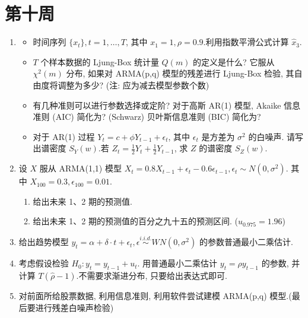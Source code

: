 \section{第十周}
\begin{enumerate}
    \item
    \begin{itemize}
    \item[1)] 时间序列 $\{x_{t}\}, t=1,\dots,T$, 其中 $x_{1}=1, \rho=0.9$.利用指数平滑公式计算 $\hat{x}_{3}$.
    
    \item[2)] $T$ 个样本数据的 Ljung-Box 统计量 $Q(m)$ 的定义是什么? 它服从 $\chi^{2}(m)$ 分布, 如果对 ARMA(p,q) 模型的残差进行 Ljung-Box 检验, 其自由度将调整为多少? (注: 应为减去模型参数个数)
    
    \item[3)] 有几种准则可以进行参数选择或定阶? 对于高斯 AR(1) 模型, Akaike 信息准则 (AIC) 简化为? (Schwarz) 贝叶斯信息准则 (BIC) 简化为?
    
    \item[4)] 对于 AR(1) 过程 $Y_{t}=c+\phi Y_{t-1}+\epsilon_{t}$, 其中 $\epsilon_t$ 是方差为 $\sigma^{2}$ 的白噪声.
    请写出谱密度 $S_{Y}(w)$.若 $Z_{t}=\frac{1}{2}Y_{t}+\frac{1}{2}Y_{t-1}$, 求 $Z$ 的谱密度 $S_{Z}(w)$.
   \end{itemize}

    \item 设 $X$ 服从 ARMA(1,1) 模型 $X_{t}=0.8X_{t-1}+\epsilon_{t}-0.6\epsilon_{t-1}, \epsilon_{t}\sim N(0,\sigma^{2})$.
    其中 $X_{100}=0.3, \epsilon_{100}=0.01$.
    \begin{enumerate}
        \item[(a)] 给出未来 1、2 期的预测值.
        \item[(b)] 给出未来 1、2 期的预测值的百分之九十五的预测区间. ($u_{0.975}=1.96$)
    \end{enumerate}

    \item 给出趋势模型 $y_{t}=\alpha+\delta \cdot t+\epsilon_{t}, \epsilon \overset{i.i.d.}{\sim} WN(0,\sigma^{2})$ 的参数普通最小二乘估计.

    \item 考虑假设检验 $H_{0}: y_{t}=y_{t-1}+u_{t}$.
    用普通最小二乘估计 $y_{t}=\rho y_{t-1}$ 的参数, 并计算 $T(\hat{\rho}-1)$.不需要求渐进分布, 只要给出表达式即可.

    \item 对前面所给股票数据, 利用信息准则, 利用软件尝试建模 ARMA(p,q) 模型.(最后要进行残差白噪声检验)

\end{enumerate}

